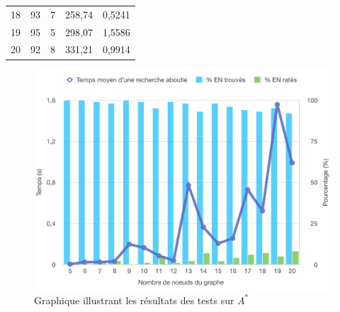 \begin{table}[!ht]
\begin{tabular}{|l||c|c|c|c|}
18                                                                                & 93                                                    & 7                                                     & 258,74                                                                 & 0,5241                                                                        \\ \cline{1-5}
19                                                                                & 95                                                    & 5                                                     & 298,07                                                                 & 1,5586                                                                        \\ \cline{1-5}
20                                                                                & 92                                                    & 8                                                     & 331,21                                                                 & 0,9914                                                                        \\ \cline{1-5}
\end{tabular}
\end{table}
\setlength{\overfullrule}{10pt}

\begin{figure}[!ht]  
	\centering
      \includegraphics[scale = 0.6]{test_projet/premierTest30.png}
		\caption{Graphique illustrant les résultats des tests sur $A^*$}
		\label{fig:premierTest}
\end{figure}


